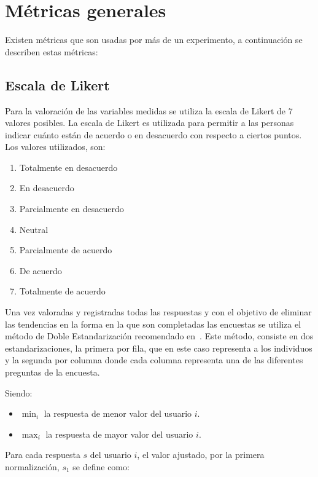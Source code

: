 
\section{Métricas generales}

Existen métricas que son usadas por más de un experimento, a continuación se describen estas métricas:

\subsection{Escala de Likert}
\label{sec:likert}

Para la valoración de las variables medidas se utiliza la escala de
Likert\cite{Allen:2007} de 7 valores posibles. La escala de Likert es utilizada
para permitir a las personas indicar cuánto están de acuerdo o en desacuerdo con
respecto a ciertos puntos. Los valores utilizados, son:

\begin{enumerate}
    \item Totalmente en desacuerdo
    \item En desacuerdo
    \item Parcialmente en desacuerdo
    \item Neutral
    \item Parcialmente de acuerdo
    \item De acuerdo
    \item Totalmente de acuerdo
\end{enumerate}

Una vez valoradas y registradas todas las respuestas y con el objetivo de
eliminar las tendencias en la forma en la que son completadas las
encuestas\cite{Fischer2010} se utiliza el método de Doble Estandarización
recomendado en~\cite{Pagolu2011}. Este método, consiste en dos
estandarizaciones, la primera por fila, que en este caso representa a los
individuos y la segunda por columna donde cada columna representa una de las
diferentes preguntas de la encuesta.

Siendo:
\begin{itemize}
	\item $\min_i$ la respuesta de menor valor del usuario $i$.
	\item $\max_i$ la respuesta de mayor valor del usuario $i$.
\end{itemize}

Para cada respuesta $s$ del usuario $i$, el valor ajustado, por la primera 
normalización, $s_1$ se define como:

